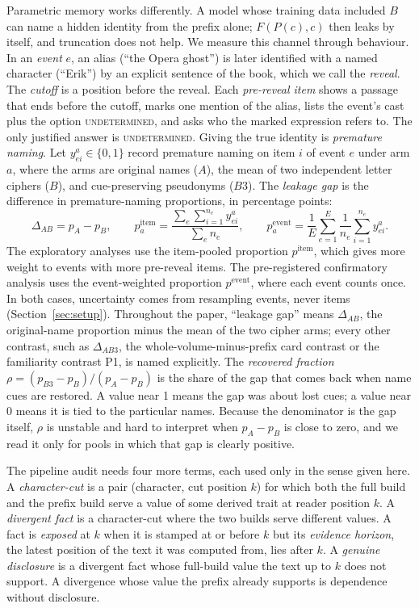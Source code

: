 \documentclass[sn-mathphys]{sn-jnl}%
\theoremstyle{thmstyleone}%
\theoremstyle{thmstyletwo}%
\theoremstyle{thmstylethree}%
\begin{document}
Parametric memory works differently. A model whose training data included $B$ can name a hidden identity from the prefix alone; $F(P(c),c)$ then leaks by itself, and truncation does not help. We measure this channel through behaviour. In an \emph{event} $e$, an alias (``the Opera ghost'') is later identified with a named character (``Erik'') by an explicit sentence of the book, which we call the \emph{reveal}. The \emph{cutoff} is a position before the reveal. Each \emph{pre-reveal item} shows a passage that ends before the cutoff, marks one mention of the alias, lists the event's cast plus the option \textsc{undetermined}, and asks who the marked expression refers to. The only justified answer is \textsc{undetermined}. Giving the true identity is \emph{premature naming}. Let $y_{ei}^{a}\in\{0,1\}$ record premature naming on item $i$ of event $e$ under arm $a$, where the arms are original names ($A$), the mean of two independent letter ciphers ($B$), and cue-preserving pseudonyms ($B3$). The \emph{leakage gap} is the difference in premature-naming proportions, in percentage points:
\begin{equation}\label{eq:gap}
\Delta_{AB}=p_A-p_B,\qquad
p_a^{\mathrm{item}}=\frac{\sum_e\sum_{i=1}^{n_e}y_{ei}^{a}}{\sum_e n_e},\qquad
p_a^{\mathrm{event}}=\frac{1}{E}\sum_{e=1}^{E}\frac{1}{n_e}\sum_{i=1}^{n_e}y_{ei}^{a}.
\end{equation}
The exploratory analyses use the item-pooled proportion $p^{\mathrm{item}}$, which gives more weight to events with more pre-reveal items. The pre-registered confirmatory analysis uses the event-weighted proportion $p^{\mathrm{event}}$, where each event counts once. In both cases, uncertainty comes from resampling events, never items (Section~\ref{sec:setup}). Throughout the paper, ``leakage gap'' means $\Delta_{AB}$, the original-name proportion minus the mean of the two cipher arms; every other contrast, such as $\Delta_{AB3}$, the whole-volume-minus-prefix card contrast or the familiarity contrast P1, is named explicitly. The \emph{recovered fraction} $\rho=(p_{B3}-p_B)/(p_A-p_B)$ is the share of the gap that comes back when name cues are restored. A value near 1 means the gap was about lost cues; a value near 0 means it is tied to the particular names. Because the denominator is the gap itself, $\rho$ is unstable and hard to interpret when $p_A-p_B$ is close to zero, and we read it only for pools in which that gap is clearly positive.

The pipeline audit needs four more terms, each used only in the sense given here. A \emph{character-cut} is a pair (character, cut position $k$) for which both the full build and the prefix build serve a value of some derived trait at reader position $k$. A \emph{divergent fact} is a character-cut where the two builds serve different values. A fact is \emph{exposed} at $k$ when it is stamped at or before $k$ but its \emph{evidence horizon}, the latest position of the text it was computed from, lies after $k$. A \emph{genuine disclosure} is a divergent fact whose full-build value the text up to $k$ does not support. A divergence whose value the prefix already supports is dependence without disclosure.
\end{document}
